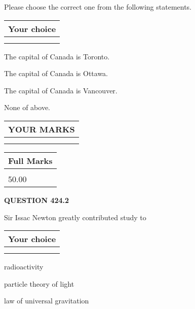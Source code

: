\documentclass[12pt]{article}
\begin{document}
  
Please choose the correct one from the following statements.
  
  
\noindent\hspace{3.0in} \begin{tabular}{|l|}
\hline
Your choice \\
\hline
 \\ 
 \\ 
\hline
\end{tabular}
  
  
 
 
The capital of Canada is Toronto.
 
 
The capital of Canada is Ottawa.
 
 
The capital of Canada is Vancouver.
 
 
 None of above.
 
 
  
\vspace{0.2in}
  
\noindent\begin{tabular}{|l|}
\hline
 YOUR MARKS  \\
\hline
 \\ 
 \\ 
\hline
\end{tabular}
\hspace{0.05in} \begin{tabular}{|l|}
\hline
 Full Marks  \\
\hline
 \\ 
50.00 \\
\hline
\end{tabular}
{\textbf{\Large{QUESTION
424.2 
}}}
  
  
Sir Issac Newton greatly contributed study to
  
  
\noindent\hspace{3.0in} \begin{tabular}{|l|}
\hline
Your choice \\
\hline
 \\ 
 \\ 
\hline
\end{tabular}
  
  
 
 
radioactivity
 
 
particle theory of light
 
 
law of universal gravitation
 
\end{document}
